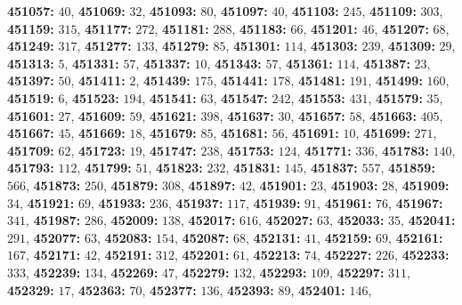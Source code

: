 \textsf{\bfseries 451057:} $40$, \textsf{\bfseries 451069:} $32$, \textsf{\bfseries 451093:} $80$, \textsf{\bfseries 451097:} $40$, \textsf{\bfseries 451103:} $245$, \textsf{\bfseries 451109:} $303$, \textsf{\bfseries 451159:} $315$, \textsf{\bfseries 451177:} $272$, \textsf{\bfseries 451181:} $288$, \textsf{\bfseries 451183:} $66$, \textsf{\bfseries 451201:} $46$, \textsf{\bfseries 451207:} $68$, \textsf{\bfseries 451249:} $317$, \textsf{\bfseries 451277:} $133$, \textsf{\bfseries 451279:} $85$, \textsf{\bfseries 451301:} $114$, \textsf{\bfseries 451303:} $239$, \textsf{\bfseries 451309:} $29$, \textsf{\bfseries 451313:} $5$, \textsf{\bfseries 451331:} $57$, \textsf{\bfseries 451337:} $10$, \textsf{\bfseries 451343:} $57$, \textsf{\bfseries 451361:} $114$, \textsf{\bfseries 451387:} $23$, \textsf{\bfseries 451397:} $50$, \textsf{\bfseries 451411:} $2$, \textsf{\bfseries 451439:} $175$, \textsf{\bfseries 451441:} $178$, \textsf{\bfseries 451481:} $191$, \textsf{\bfseries 451499:} $160$, \textsf{\bfseries 451519:} $6$, \textsf{\bfseries 451523:} $194$, \textsf{\bfseries 451541:} $63$, \textsf{\bfseries 451547:} $242$, \textsf{\bfseries 451553:} $431$, \textsf{\bfseries 451579:} $35$, \textsf{\bfseries 451601:} $27$, \textsf{\bfseries 451609:} $59$, \textsf{\bfseries 451621:} $398$, \textsf{\bfseries 451637:} $30$, \textsf{\bfseries 451657:} $58$, \textsf{\bfseries 451663:} $405$, \textsf{\bfseries 451667:} $45$, \textsf{\bfseries 451669:} $18$, \textsf{\bfseries 451679:} $85$, \textsf{\bfseries 451681:} $56$, \textsf{\bfseries 451691:} $10$, \textsf{\bfseries 451699:} $271$, \textsf{\bfseries 451709:} $62$, \textsf{\bfseries 451723:} $19$, \textsf{\bfseries 451747:} $238$, \textsf{\bfseries 451753:} $124$, \textsf{\bfseries 451771:} $336$, \textsf{\bfseries 451783:} $140$, \textsf{\bfseries 451793:} $112$, \textsf{\bfseries 451799:} $51$, \textsf{\bfseries 451823:} $232$, \textsf{\bfseries 451831:} $145$, \textsf{\bfseries 451837:} $557$, \textsf{\bfseries 451859:} $566$, \textsf{\bfseries 451873:} $250$, \textsf{\bfseries 451879:} $308$, \textsf{\bfseries 451897:} $42$, \textsf{\bfseries 451901:} $23$, \textsf{\bfseries 451903:} $28$, \textsf{\bfseries 451909:} $34$, \textsf{\bfseries 451921:} $69$, \textsf{\bfseries 451933:} $236$, \textsf{\bfseries 451937:} $117$, \textsf{\bfseries 451939:} $91$, \textsf{\bfseries 451961:} $76$, \textsf{\bfseries 451967:} $341$, \textsf{\bfseries 451987:} $286$, \textsf{\bfseries 452009:} $138$, \textsf{\bfseries 452017:} $616$, \textsf{\bfseries 452027:} $63$, \textsf{\bfseries 452033:} $35$, \textsf{\bfseries 452041:} $291$, \textsf{\bfseries 452077:} $63$, \textsf{\bfseries 452083:} $154$, \textsf{\bfseries 452087:} $68$, \textsf{\bfseries 452131:} $41$, \textsf{\bfseries 452159:} $69$, \textsf{\bfseries 452161:} $167$, \textsf{\bfseries 452171:} $42$, \textsf{\bfseries 452191:} $312$, \textsf{\bfseries 452201:} $61$, \textsf{\bfseries 452213:} $74$, \textsf{\bfseries 452227:} $226$, \textsf{\bfseries 452233:} $333$, \textsf{\bfseries 452239:} $134$, \textsf{\bfseries 452269:} $47$, \textsf{\bfseries 452279:} $132$, \textsf{\bfseries 452293:} $109$, \textsf{\bfseries 452297:} $311$, \textsf{\bfseries 452329:} $17$, \textsf{\bfseries 452363:} $70$, \textsf{\bfseries 452377:} $136$, \textsf{\bfseries 452393:} $89$, \textsf{\bfseries 452401:} $146$, 
